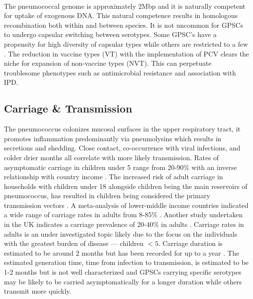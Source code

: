\documentclass{article}
\begin{document}
\\The pneumococcal genome is approximately 2Mbp and it is naturally competent for uptake of exogenous DNA. This natural competence results in homologous recombination both within and between species. It is not uncommon for GPSCs to undergo capsular switching between serotypes. Some GPSC’s have a propensity for high diversity of capsular types while others are restricted to a few \cite{loPneumococcalLineagesAssociated2019}. The reduction in vaccine types (VT) with the implementation of PCV clears the niche for expansion of non-vaccine types (NVT). This can perpetuate troublesome phenotypes such as antimicrobial resistance and association with IPD.
\subsection{Carriage \& Transmission} 
The pneumococcus colonizes mucosal surfaces in the upper respiratory tract, it promotes inflammation predominantly via pneumolysins which results in secretions and shedding. Close contact, co-occurrence with viral infections, and colder drier months all correlate with more likely transmission\cite{weiserStreptococcusPneumoniaeTransmission2018}. Rates of asymptomatic carriage in children under 5 range from 20-90\% with an inverse relationship with country income \cite{almeidaDynamicsPneumococcalCarriage2020,adegbolaCarriageStreptococcusPneumoniae2014}. The increased risk of adult carriage in households with children under 18 alongside children being the main reservoirs of pneumococcus, has resulted in children being considered the primary transmission vectors \cite{almeidaDynamicsPneumococcalCarriage2020,bogaertStreptococcusPneumoniaeColonisation2004}. A meta-analysis of lower-middle income countries indicated a wide range of carriage rates in adults from 8-85\% \cite{adegbolaCarriageStreptococcusPneumoniae2014}. Another study undertaken in the UK indicates a carriage prevalence of 20-40\% in adults\cite{almeidaDynamicsPneumococcalCarriage2020} . Carriage rates in adults is an under investigated topic likely due to the focus on the individuals with the greatest burden of disease --- children $<5$.  Carriage duration is estimated to be around 2 months but has been recorded for up to a year \cite{almeidaDynamicsPneumococcalCarriage2020,dubeLongitudinalCharacterizationNasopharyngeal2018}. The estimated generation time, time from infection to transmission, is estimated to be 1-2 months but is not well characterized and GPSCs carrying specific serotypes may be likely to be carried asymptomatically for a longer duration while others transmit more quickly\cite{leesGenomewideIdentificationLineage2017}.
\end{document}
